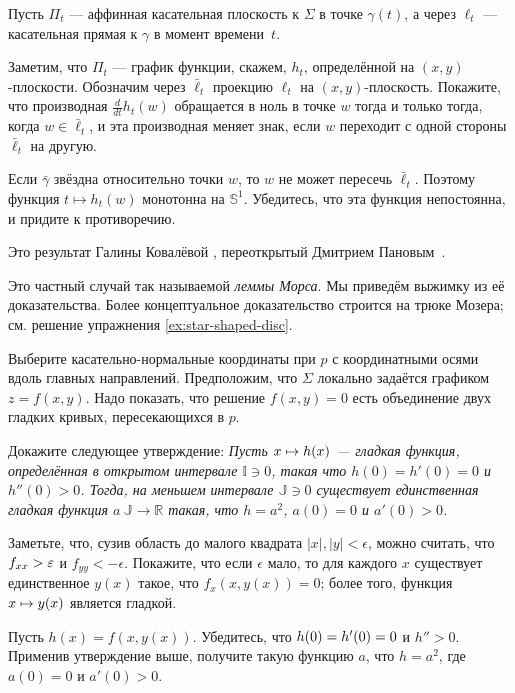 \begin{multicols}{2}
Пусть $\Pi_t$ --- аффинная касательная плоскость к $\Sigma$ в точке $\gamma(t)$, а через $\ell_t$ --- касательная прямая к $\gamma$ в момент времени~$t$.

Заметим, что $\Pi_t$ --- график функции, скажем, $h_t$, определённой на $(x, y)$-плоскости.
Обозначим через $\bar\ell_t$ проекцию $\ell_t$ на $(x, y)$-плоскость.
Покажите, что производная $\tfrac{d}{dt}h_t(w)$ обращается в ноль в точке $w$ тогда и только тогда, когда $w\in \bar\ell_t$, и эта производная меняет знак, если $w$ переходит с одной стороны $\bar\ell_t$ на другую.

Если $\bar\gamma$ звёздна относительно точки $w$, то $w$ не может пересечь $\bar\ell_t$.
Поэтому функция $t\mapsto h_t(w)$ монотонна на $\mathbb{S}^1$.
Убедитесь, что эта функция непостоянна, и придите к противоречию.

Это результат Галины Ковалёвой \cite{kovaleva}, переоткрытый Дмитрием Пановым~\cite{panov-curves}.

Это частный случай так называемой \emph{леммы Морса}.
Мы приведём выжимку из её доказательства.
Более концептуальное доказательство \cite{abraham-marsden-ratiu} строится на трюке Мозера; см. решение упражнения \ref{ex:star-shaped-disc}.

\medskip

Выберите касательно-нормальные координаты при $p$ с координатными осями вдоль главных направлений.
Предположим, что $\Sigma$ локально задаётся графиком $z=f(x,y)$.
Надо показать, что решение $f(x,y)=0$ есть объединение двух гладких кривых, пересекающихся в $p$.

Докажите следующее утверждение:
\textit{Пусть $x\z\mapsto h(x)$ --- гладкая функция, определённая в открытом интервале $\mathbb{I}\ni0$, такая что $h(0)=h'(0)=0$ и $h''(0)>0$.
Тогда, на меньшем интервале $\mathbb{J}\ni0$ существует единственная гладкая функция $a\:\mathbb{J}\to\mathbb{R}$ такая, что $h=a^2$, $a(0)=0$ и $a'(0)> 0$.}

Заметьте, что, сузив область до малого квадрата  $|x|,|y|<\epsilon$, можно считать, что $f_{xx}\z>\epsilon$ и $f_{yy}<-\epsilon$.
Покажите, что если $\epsilon$ мало, то для каждого $x$ существует единственное $y(x)$ такое, что $f_x(x,y(x))=0$; более того, функция $x\z\mapsto y(x)$ является гладкой.

Пусть $h(x)=f(x,y(x))$.
Убедитесь, что $h(0)\z=h'(0)=0$ и $h''>0$.
Применив утверждение выше, получите такую функцию $a$, что $h=a^2$, где $a(0)=0$ и $a'(0)>0$.


\end{multicols}
